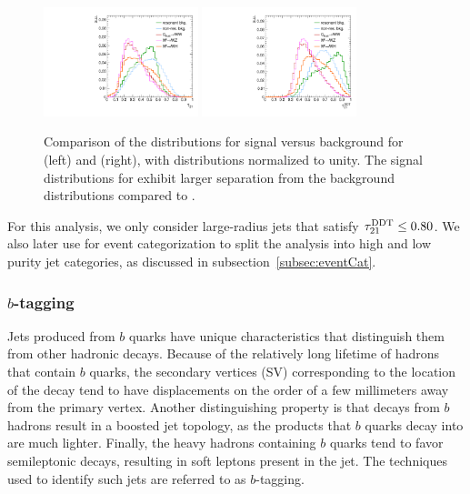 \begin{figure}[htbp]
  \centering
  \includegraphics[width=0.4\textwidth]{fig/eventSelection/hists_SR_mjet30to210_2017_tau21.pdf}
  \includegraphics[width=0.4\textwidth]{fig/eventSelection/hists_SR_mjet30to210_2017_tau21DDT.pdf}
  \caption{
    Comparison of the distributions for signal versus background for \nsubj (left) and \nsubjDDT (right), with distributions normalized to unity.
    The signal distributions for \nsubjDDT exhibit larger separation from the background distributions compared to \nsubj.
  }
  \label{fig:tau21DDTComp}
\end{figure}

For this analysis, we only consider large-radius jets that satisfy $\tau_{21}^\mathrm{DDT}\leq0.80$.
We also later use \nsubjDDT for event categorization to split the analysis into high and low purity jet categories, as discussed in subsection~\ref{subsec:eventCat}.

\subsubsection{$b$-tagging}

Jets produced from $b$ quarks have unique characteristics that distinguish them from other hadronic decays.
Because of the relatively long lifetime of hadrons that contain $b$ quarks, the secondary vertices (SV) corresponding to the location of the decay tend to have displacements on the order of a few millimeters away from the primary vertex.
Another distinguishing property is that decays from $b$ hadrons result in a boosted jet topology, as the products that $b$ quarks decay into are much lighter.
Finally, the heavy hadrons containing $b$ quarks tend to favor semileptonic decays, resulting in soft leptons present in the jet.
The techniques used to identify such jets are referred to as $b$-tagging.

